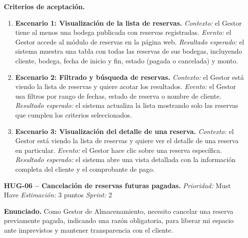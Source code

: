 \textbf{Criterios de aceptación.}
\begin{enumerate}
\item \textbf{Escenario 1: Visualización de la lista de reservas.} \textit{Contexto:} el Gestor tiene al menos una bodega publicada con reservas registradas. \textit{Evento:} el Gestor accede al módulo de reservas en la página web. \textit{Resultado esperado:} el sistema muestra una tabla con todas las reservas de sus bodegas, incluyendo cliente, bodega, fecha de inicio y fin, estado (pagada o cancelada) y monto.
\item \textbf{Escenario 2: Filtrado y búsqueda de reservas.} \textit{Contexto:} el Gestor está viendo la lista de reservas y quiere acotar los resultados. \textit{Evento:} el Gestor usa filtros por rango de fechas, estado de reserva o nombre de cliente. \textit{Resultado esperado:} el sistema actualiza la lista mostrando solo las reservas que cumplen los criterios seleccionados.
\item \textbf{Escenario 3: Visualización del detalle de una reserva.} \textit{Contexto:} el Gestor está viendo la lista de reservas y quiere ver el detalle de una reserva en particular. \textit{Evento:} el Gestor hace clic sobre una reserva específica. \textit{Resultado esperado:} el sistema abre una vista detallada con la información completa del cliente y el comprobante de pago.
\end{enumerate}

\textbf{HUG-06 -- Cancelación de reservas futuras pagadas.} \label{req:HUG-06}
\textit{Prioridad:} Must Have \quad \textit{Estimación:} 3 puntos \quad \textit{Sprint:} 2

\textbf{Enunciado.} Como Gestor de Almacenamiento, necesito cancelar una reserva previamente pagada, indicando una razón obligatoria, para liberar mi espacio ante imprevistos y mantener transparencia con el cliente.

